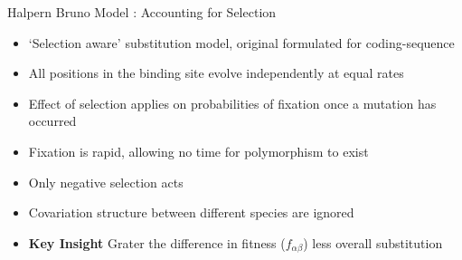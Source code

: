\documentclass[10pt]{beamer}
\begin{document}
\begin{frame}[fragile]{Halpern Bruno Model : Accounting for Selection }
\begin{itemize}
\item `Selection aware' substitution model, original formulated for coding-sequence
\item All positions in the binding site evolve independently at equal rates
\item Effect of selection applies on probabilities of fixation once a mutation has occurred
\item Fixation is rapid, allowing no time for polymorphism to exist
\item Only negative selection acts
\item Covariation structure between different species are ignored
\item \textbf{Key Insight} Grater the difference in fitness ($f_{\alpha\beta}$) less overall substitution
\end{itemize}
\end{frame}
\end{document}
